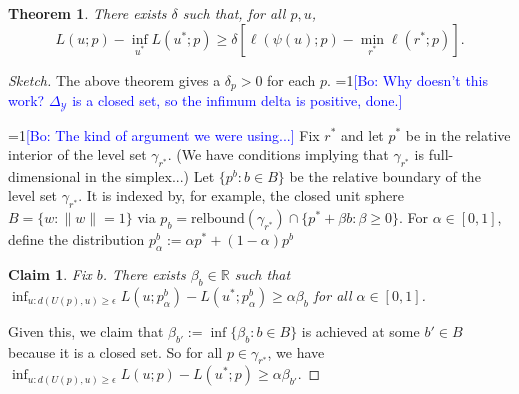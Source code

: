 \documentclass{article}
\newcommand{\Comments}{1}
\newcommand{\mynote}[2]{\ifnum\Comments=1\textcolor{#1}{#2}\fi}
\newcommand{\bo}[1]{\mynote{blue}{[Bo: #1]}}
\newcommand{\reals}{\mathbb{R}}
\newcommand{\Y}{\mathcal{Y}}
\newtheorem{theorem}{Theorem}
\newtheorem{claim}{Claim}
\theoremstyle{definition}
\begin{document}
\begin{theorem}
  There exists $\delta$ such that, for all $p,u$,
    \[ L(u;p) - \inf_{u^*} L(u^*;p) \geq \delta \left[ \ell(\psi(u);p) - \min_{r^*} \ell(r^*;p) \right] . \]
\end{theorem}
\begin{proof}[Sketch]
  The above theorem gives a $\delta_p > 0$ for each $p$.
  \bo{Why doesn't this work? $\Delta_{\Y}$ is a closed set, so the infimum delta is positive, done.}

  \bo{The kind of argument we were using...}
  Fix $r^*$ and let $p^*$ be in the relative interior of the level set $\gamma_{r^*}$. (We have conditions implying that $\gamma_{r^*}$ is full-dimensional in the simplex...)
  Let $\{ p^b : b \in B\}$ be the relative boundary of the level set $\gamma_{r^*}$.
  It is indexed by, for example, the closed unit sphere $B = \{w : \|w\|=1\}$ via $p_b = \text{relbound}(\gamma_{r^*}) \cap \{p^* + \beta b : \beta \geq 0\}$.
  For $\alpha \in [0,1]$, define the distribution $p^b_{\alpha} := \alpha p^* + (1-\alpha) p^b$ 
  \begin{claim} \label{claim:p-bound-1}
    Fix $b$.
    There exists $\beta_b \in \reals$ such that $\inf_{u: d(U(p),u) \geq \epsilon} L(u;p^b_{\alpha}) - L(u^*;p^b_{\alpha}) \geq \alpha \beta_b$ for all $\alpha \in [0,1]$.
  \end{claim}
  Given this, we claim that $\beta_{b'} := \inf \{\beta_b : b \in B\}$ is achieved at some $b' \in B$ because it is a closed set.
  So for all $p \in \gamma_{r^*}$, we have $\inf_{u: d(U(p),u) \geq \epsilon} L(u;p) - L(u^*;p) \geq \alpha \beta_{b'}$.
\end{proof}





%
%
%
%
\end{document}
